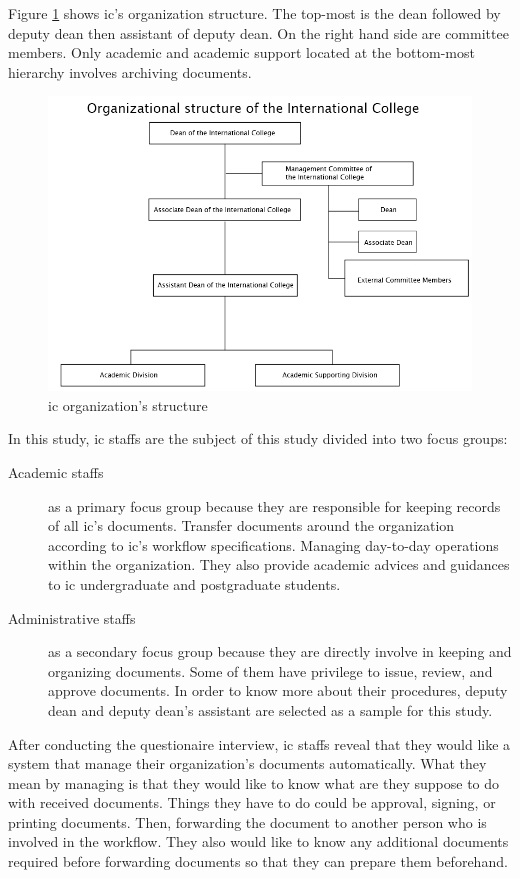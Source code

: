 Figure \ref{ic-org-sturcture} shows \gls{ic}'s organization structure.
The top-most is the dean followed by deputy dean then assistant of deputy dean.
On the right hand side are committee members.
Only academic and academic support located at the bottom-most hierarchy involves archiving documents.
 \begin{figure}[h]
 	\centering
 	\caption{\gls{ic} organization's structure}
 	\label{ic-org-sturcture}
 	\includegraphics[scale=0.7]{res/requirement/ic-org}
 \end{figure}

In this study, \gls{ic} staffs are the subject of this study divided into two focus groups:
\begin{description}
	\item [Academic staffs] as a primary focus group because they are responsible for keeping records of all \gls{ic}'s documents.
	Transfer documents around the organization according to \gls{ic}'s workflow specifications.
	Managing day-to-day operations within the organization.
	They also provide academic advices and guidances to \gls{ic} undergraduate and postgraduate students.

	\item [Administrative staffs] as a secondary focus group because they are directly involve in keeping and organizing documents.
	Some of them have privilege to issue, review, and approve documents.
	In order to know more about their procedures, deputy dean and deputy dean's assistant are selected as a sample for this study.
\end{description}

After conducting the questionaire interview, \gls{ic} staffs reveal that they would like a system that manage their organization's documents automatically.
What they mean by managing is that they would like to know what are they suppose to do with received documents.
Things they have to do could be approval, signing, or printing documents.
Then, forwarding the document to another person who is involved in the workflow. 
They also would like to know any additional documents required before forwarding documents so that they can prepare them beforehand.


